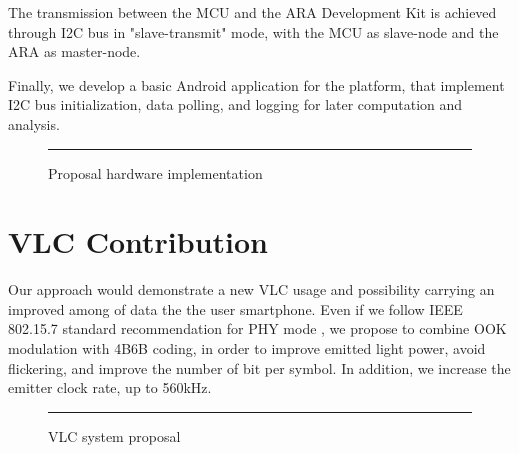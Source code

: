 The transmission between the MCU and the ARA Development Kit is achieved through I2C bus in "slave-transmit" mode, with the MCU as slave-node and the ARA as master-node.

Finally, we develop a basic Android application for the platform, that implement I2C bus initialization, data polling, and logging for later computation and analysis.

\begin{figure}[htbp]
  \centering
    \rule{35em}{0.5pt}
  \caption[Proposal hardware implementation]{Proposal hardware implementation}
  \label{fig:RxCircuit}
\end{figure}



\section{VLC Contribution}

Our approach would demonstrate a new VLC usage and possibility carrying an improved among of data the the user smartphone. Even if we follow IEEE 802.15.7 standard recommendation for PHY mode , we propose to combine OOK modulation with 4B6B coding, in order to improve emitted light power, avoid flickering, and improve the number of bit per symbol. In addition, we increase the emitter clock rate, up to 560kHz.

\begin{figure}[htbp]
  \centering
    \rule{35em}{0.5pt}
  \caption[VLC system proposal]{VLC system proposal}
  \label{fig:RxCircuit}
\end{figure}


